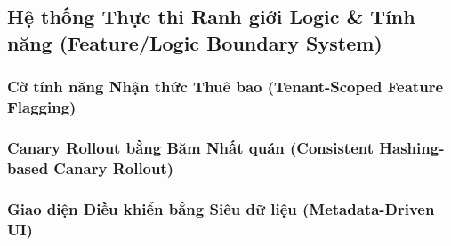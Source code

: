 \par{}
\subsection{Hệ thống Thực thi Ranh giới Logic \& Tính năng (Feature/Logic Boundary System)}
\label{outline:2:mechanisms:16}

\par{}
\subsubsection{Cờ tính năng Nhận thức Thuê bao (Tenant-Scoped Feature Flagging)}
\label{outline:2:mechanisms:17}

\par{}
\subsubsection{Canary Rollout bằng Băm Nhất quán (Consistent Hashing-based Canary Rollout)}
\label{outline:2:mechanisms:18}

\par{}
\subsubsection{Giao diện Điều khiển bằng Siêu dữ liệu (Metadata-Driven UI)}
\label{outline:2:mechanisms:19}
